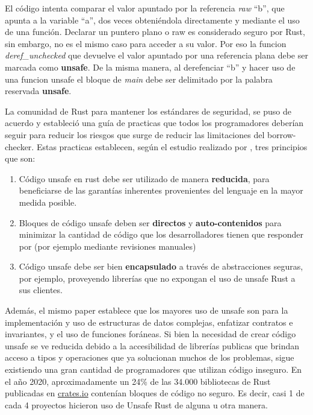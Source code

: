 El código intenta comparar el valor apuntado por la referencia \textit{raw} ``b'', que apunta a la variable ``a'', dos veces obteniéndola directamente y mediante el uso de una función. Declarar un puntero plano o raw es considerado seguro por Rust, sin embargo, no es el mismo caso para acceder a su valor. Por eso la funcion \textit{deref\_unchecked} que devuelve el valor apuntado por una referencia plana debe ser marcada como \textbf{unsafe}. De la misma manera, al derefenciar ``b'' y hacer uso de una funcion unsafe el bloque de \textit{main} debe ser delimitado por la palabra reservada \textbf{unsafe}.

La comunidad de Rust para mantener los estándares de seguridad, se puso de acuerdo y estableció una guía de practicas que todos los programadores deberían seguir para reducir los riesgos que surge de reducir las limitaciones del borrow-checker. Estas practicas establecen, según el estudio realizado por \cite{astrauskas2020programmers}, tres principios que son:
\begin{enumerate}
  \item Código unsafe en rust debe ser utilizado de manera \textbf{reducida}, para beneficiarse de las garantías inherentes provenientes del lenguaje en la mayor medida posible.
  \item Bloques de código unsafe deben ser \textbf{directos} y \textbf{auto-contenidos} para minimizar la cantidad de código que los desarrolladores tienen que responder por (por ejemplo mediante revisiones manuales)
  \item Código unsafe debe ser bien \textbf{encapsulado} a través de abstracciones seguras, por ejemplo, proveyendo librerías que no expongan el uso de unsafe Rust a sus clientes.
\end{enumerate}

Además, el mismo paper establece que los mayores uso de unsafe son para la implementación y uso de estructuras de datos complejas, enfatizar contratos e invariantes, y el uso de funciones foráneas. Si bien la necesidad de crear código unsafe se ve reducida debido a la accesibilidad de librerías publicas que brindan acceso a tipos y operaciones que ya solucionan muchos de los problemas, sigue existiendo una gran cantidad de programadores que utilizan código inseguro. En el año 2020, aproximadamente un 24\% de las 34.000 bibliotecas de Rust publicadas en \url{crates.io} contenían bloques de código no seguro. Es decir, casi 1 de cada 4 proyectos hicieron uso de Unsafe Rust de alguna u otra manera.

